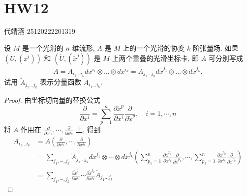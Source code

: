 \documentclass[../main.tex]{subfiles}
\begin{document}
\ifSubfilesClassLoaded{

    
   \setcounter{chapter}{11}
}{}

\chapter{ HW12 }
 代靖涵 25120222201319
\begin{exercise}{}{}
设 $M$ 是一个光滑的 $n$ 维流形, $A$ 是 $M$ 上的一个光滑的协变 $k$ 阶张量场. 如果 $(U, (x^i))$ 和 $(\tilde{U}, (\tilde{x}^j))$ 是 $M$ 上两个重叠的光滑坐标卡, 即 $A$ 可分别写成
\[
A = A_{i_1 \dots i_k} dx^{i_1} \otimes \dots \otimes dx^{i_k} = \tilde{A}_{j_1 \dots j_k} d\tilde{x}^{j_1} \otimes \dots \otimes d\tilde{x}^{j_k}.
\]
试用 $\tilde{A}_{j_1 \dots j_k}$ 表示分量函数 $A_{i_1 \dots i_k}$.
\end{exercise}
\begin{proof}
由坐标切向量的替换公式
    \[
    \frac{\partial }{\partial x^{i}}= \sum _{p= 1}^{n}\frac{\partial \tilde{x}^{p}}{\partial x^{i}}\frac{\partial }{\partial \tilde{x}^{p}},\quad i=  1,\cdots,n 
    \]
    将 \( A \) 作用在 \( \frac{\partial }{\partial x^{i_1}},\cdots ,\frac{\partial }{\partial x^{i_{k}}} \) 上, 得到
    \[
    \begin{aligned}
    A_{i_1 \dots i_{k}} &= A\left( \frac{\partial }{\partial x^{i_1}},\cdots ,\frac{\partial }{\partial x^{i_{k}}} \right)\\ 
     &= \sum _{j_1,\cdots ,j_{k}}\tilde{A}_{j_1 \dots j_{k}} d \tilde{x}^{j_1}\otimes \cdots \otimes d \tilde{x}^{j_{k}}\left( \sum _{p_1= 1}^{n}\frac{\partial \tilde{x}^{p_1}}{\partial x^{i_1}}\frac{\partial }{\partial \tilde{x}^{p_1}},\cdots ,\sum _{p_k= 1}^{n} \frac{\partial \tilde{x}^{p_k}}{\partial x^{i_{k}}}\frac{\partial }{\partial \tilde{x}^{p_k}} \right)\\ 
      &= \sum _{j_1,\cdots ,j_{k}}\frac{\partial \tilde{x}^{j_1}}{\partial x^{i_1}}\cdots \frac{\partial \tilde{x}^{j_{k}}}{\partial x^{i_{k}}}\tilde{A}_{j_1 \dots j_{k}}   
    \end{aligned}
    \]
\end{proof}
\end{document}
